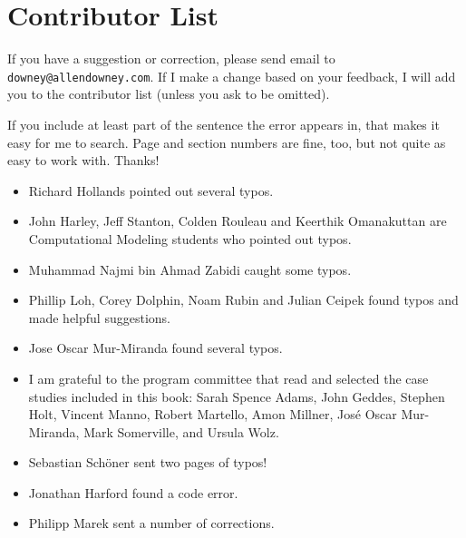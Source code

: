 \documentclass[10pt]{book}
\begin{document}
\section*{Contributor List}


If you have a suggestion or correction, please send email to
{\tt downey@allendowney.com}.  If I make a change based on your
feedback, I will add you to the contributor list
(unless you ask to be omitted).

If you include at least part of the sentence the
error appears in, that makes it easy for me to search.  Page and
section numbers are fine, too, but not quite as easy to work with.
Thanks!

\small

\begin{itemize}

\item Richard Hollands pointed out several typos.

\item John Harley, Jeff Stanton, Colden Rouleau and
Keerthik Omanakuttan are Computational Modeling students who
pointed out typos.

\item Muhammad Najmi bin Ahmad Zabidi caught some typos.

\item Phillip Loh, Corey Dolphin, Noam Rubin and Julian Ceipek
found typos and made helpful suggestions.

\item Jose Oscar Mur-Miranda found several typos.

\item I am grateful to the program committee that read and selected
the case studies included in this book: 
Sarah Spence Adams,
John Geddes,
Stephen Holt,
Vincent Manno,
Robert Martello,
Amon Millner,
Jos\'{e} Oscar Mur-Miranda,
Mark Somerville, and
Ursula Wolz.

\item Sebastian Sch\"{o}ner sent two pages of typos!

\item Jonathan Harford found a code error.

\item Philipp Marek sent a number of corrections.


\end{itemize}
\end{document}
